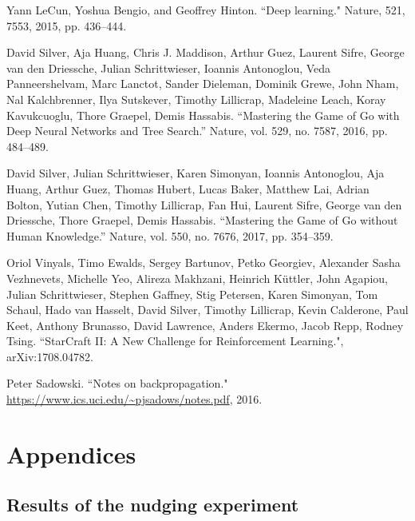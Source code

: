 \documentclass[a4paper, 10pt, notitlepage, twocolumn]{article}
\begin{document}
\begin{thebibliography}{XX}

Yann LeCun, Yoshua Bengio, and Geoffrey Hinton. ``Deep learning." Nature, 521, 7553, 2015, pp. 436–444.

 David Silver, Aja Huang, Chris J. Maddison, Arthur Guez, Laurent Sifre, George van den Driessche, Julian Schrittwieser, Ioannis Antonoglou, Veda Panneershelvam, Marc Lanctot, Sander Dieleman, Dominik Grewe, John Nham, Nal Kalchbrenner, Ilya Sutskever, Timothy Lillicrap, Madeleine Leach, Koray Kavukcuoglu, Thore Graepel, Demis Hassabis. “Mastering the Game of Go with Deep Neural Networks and Tree Search.” Nature, vol. 529, no. 7587, 2016, pp. 484–489.
 
 David Silver, Julian Schrittwieser, Karen Simonyan, Ioannis Antonoglou, Aja Huang, Arthur Guez, Thomas Hubert, Lucas Baker, Matthew Lai, Adrian Bolton, Yutian Chen, Timothy Lillicrap, Fan Hui, Laurent Sifre, George van den Driessche, Thore Graepel, Demis Hassabis. “Mastering the Game of Go without Human Knowledge.” Nature, vol. 550, no. 7676, 2017, pp. 354–359. 
 
Oriol Vinyals, Timo Ewalds, Sergey Bartunov, Petko Georgiev, Alexander Sasha Vezhnevets, Michelle Yeo, Alireza Makhzani, Heinrich Küttler, John Agapiou, Julian Schrittwieser, Stephen Gaffney, Stig Petersen, Karen Simonyan, Tom Schaul, Hado van Hasselt, David Silver, Timothy Lillicrap, Kevin Calderone, Paul Keet, Anthony Brunasso, David Lawrence, Anders Ekermo, Jacob Repp, Rodney Tsing. ``StarCraft II: A New Challenge for
Reinforcement Learning.", arXiv:1708.04782.

Peter Sadowski. ``Notes on backpropagation." \url{https://www.ics.uci.edu/~pjsadows/notes.pdf}, 2016.

\end{thebibliography}

\newpage

\appendix
\section*{Appendices}
\renewcommand{\thesubsection}{\Alph{subsection}}

\subsection{Results of the nudging experiment}
\label{nudgeappendix}
\end{document}
